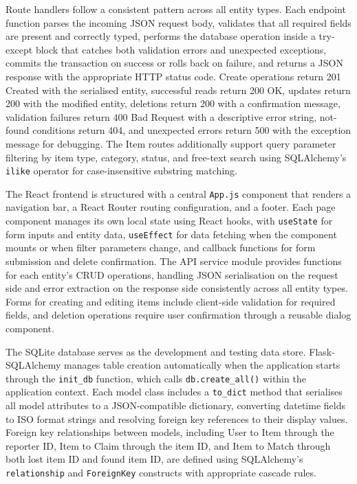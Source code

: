 \documentclass[conference]{IEEEtran}
\begin{document}
Route handlers follow a consistent pattern across all entity types. Each endpoint function parses the incoming JSON request body, validates that all required fields are present and correctly typed, performs the database operation inside a try-except block that catches both validation errors and unexpected exceptions, commits the transaction on success or rolls back on failure, and returns a JSON response with the appropriate HTTP status code. Create operations return 201 Created with the serialised entity, successful reads return 200 OK, updates return 200 with the modified entity, deletions return 200 with a confirmation message, validation failures return 400 Bad Request with a descriptive error string, not-found conditions return 404, and unexpected errors return 500 with the exception message for debugging. The Item routes additionally support query parameter filtering by item type, category, status, and free-text search using SQLAlchemy's \texttt{ilike} operator for case-insensitive substring matching.

The React frontend is structured with a central \texttt{App.js} component that renders a navigation bar, a React Router routing configuration, and a footer. Each page component manages its own local state using React hooks, with \texttt{useState} for form inputs and entity data, \texttt{useEffect} for data fetching when the component mounts or when filter parameters change, and callback functions for form submission and delete confirmation. The API service module provides functions for each entity's CRUD operations, handling JSON serialisation on the request side and error extraction on the response side consistently across all entity types. Forms for creating and editing items include client-side validation for required fields, and deletion operations require user confirmation through a reusable dialog component.

The SQLite database serves as the development and testing data store. Flask-SQLAlchemy manages table creation automatically when the application starts through the \texttt{init\_db} function, which calls \texttt{db.create\_all()} within the application context. Each model class includes a \texttt{to\_dict} method that serialises all model attributes to a JSON-compatible dictionary, converting datetime fields to ISO format strings and resolving foreign key references to their display values. Foreign key relationships between models, including User to Item through the reporter ID, Item to Claim through the item ID, and Item to Match through both lost item ID and found item ID, are defined using SQLAlchemy's \texttt{relationship} and \texttt{ForeignKey} constructs with appropriate cascade rules.
\end{document}

